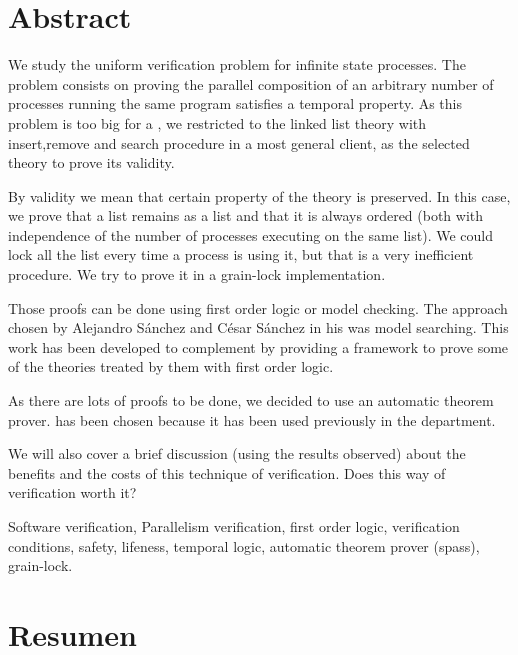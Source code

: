 \chapter*{Abstract}


\begin{abstractEn}

We study the uniform verification problem for infinite state processes. The problem consists on proving the parallel composition of an arbitrary number of processes running the same program satisfies a temporal property. As this problem is too big for a \thisworkm, we restricted to the linked list theory with insert,remove and search procedure in a most general client, as the selected theory to prove its validity. 

By validity we mean that certain property of the theory is preserved. In this case, we prove that a list remains as a list and that it is always ordered (both with independence of the number of processes executing on the same list). We could lock all the list every time a process is using it, but that is a very inefficient procedure. We try to prove it in a grain-lock implementation.


Those proofs can be done using first order logic or model checking. The approach chosen by Alejandro Sánchez and César Sánchez in his  was model searching. This work has been developed to complement  by providing a framework to prove some of the theories treated by them with first order logic. 


As there are lots of proofs to be done, we decided to use an automatic theorem prover.  has been chosen because it has been used previously in the department. 


We will also cover a brief discussion (using the results observed) about the benefits and the costs of this technique of verification. Does this way of verification worth it? 

\end{abstractEn}

\begin{keywordsEn}
Software verification, Parallelism verification, first order logic, verification conditions, safety, lifeness, temporal logic, automatic theorem prover (spass), grain-lock.
\end{keywordsEn}

\chapter*{Resumen}

